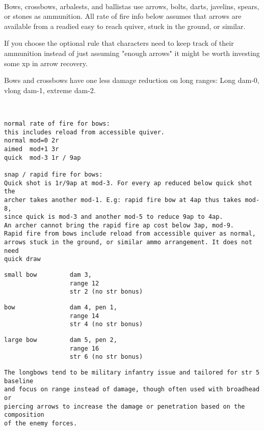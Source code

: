 \


\noindent Bows, crossbows, arbalests, and ballistas use arrows, bolts, darts, javelins, spears, or stones as ammunition. All rate of fire info below assumes that arrows are available from a readied easy to reach quiver, stuck in the ground, or similar.

If you choose the optional rule that characters need to keep track of their ammunition instead of just assuming "enough arrows" it might be worth investing some xp in arrow recovery.

Bows and crossbows have one less damage reduction on long ranges: Long dam-0, vlong dam-1, extreme dam-2.

\

\goodbreak \small \begin{samepage} \begin{verbatim}
normal rate of fire for bows:
this includes reload from accessible quiver.
normal mod=0 2r
aimed  mod+1 3r
quick  mod-3 1r / 9ap

snap / rapid fire for bows:
Quick shot is 1r/9ap at mod-3. For every ap reduced below quick shot the
archer takes another mod-1. E.g: rapid fire bow at 4ap thus takes mod-8, 
since quick is mod-3 and another mod-5 to reduce 9ap to 4ap.
An archer cannot bring the rapid fire ap cost below 3ap, mod-9.
Rapid fire from bows include reload from accessible quiver as normal, 
arrows stuck in the ground, or similar ammo arrangement. It does not need 
quick draw
\end{verbatim} \blocklistgap \begin{verbatim}
small bow         dam 3,
                  range 12
                  str 2 (no str bonus)
\end{verbatim} \blocklistgap \begin{verbatim}
bow               dam 4, pen 1,
                  range 14
                  str 4 (no str bonus)
\end{verbatim} \blocklistgap \begin{verbatim}
large bow         dam 5, pen 2,
                  range 16
                  str 6 (no str bonus)
\end{verbatim} \blocklistgap \begin{verbatim}
The longbows tend to be military infantry issue and tailored for str 5 baseline 
and focus on range instead of damage, though often used with broadhead or 
piercing arrows to increase the damage or penetration based on the composition 
of the enemy forces.


\end{verbatim}
\end{samepage}
